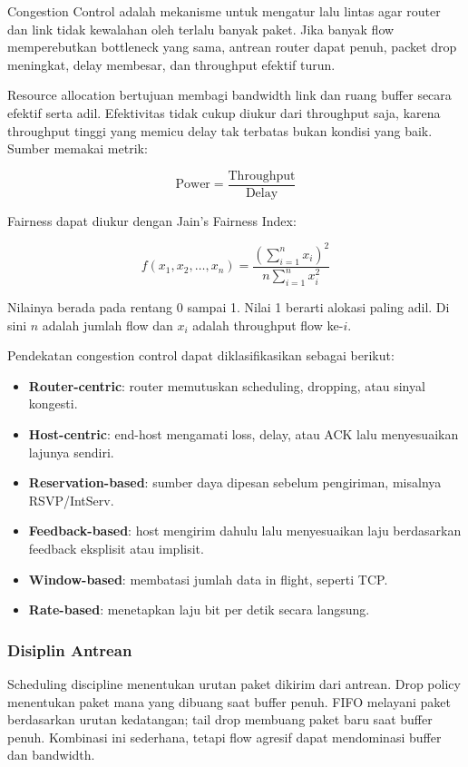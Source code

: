 \begin{jawab}
Congestion Control adalah mekanisme untuk mengatur lalu lintas agar router dan link tidak kewalahan oleh terlalu banyak paket. Jika banyak flow memperebutkan bottleneck yang sama, antrean router dapat penuh, packet drop meningkat, delay membesar, dan throughput efektif turun.
\end{jawab}

Resource allocation bertujuan membagi bandwidth link dan ruang buffer secara efektif serta adil. Efektivitas tidak cukup diukur dari throughput saja, karena throughput tinggi yang memicu delay tak terbatas bukan kondisi yang baik. Sumber memakai metrik:

\[
\text{Power} = \frac{\text{Throughput}}{\text{Delay}}
\]

Fairness dapat diukur dengan Jain's Fairness Index:

\[
f(x_1,x_2,\ldots,x_n)=\frac{\left(\sum_{i=1}^{n}x_i\right)^2}{n\sum_{i=1}^{n}x_i^2}
\]

Nilainya berada pada rentang 0 sampai 1. Nilai 1 berarti alokasi paling adil. Di sini $n$ adalah jumlah flow dan $x_i$ adalah throughput flow ke-$i$.

Pendekatan congestion control dapat diklasifikasikan sebagai berikut:

\begin{itemize}
    \item \textbf{Router-centric}: router memutuskan scheduling, dropping, atau sinyal kongesti.
    \item \textbf{Host-centric}: end-host mengamati loss, delay, atau ACK lalu menyesuaikan lajunya sendiri.
    \item \textbf{Reservation-based}: sumber daya dipesan sebelum pengiriman, misalnya RSVP/IntServ.
    \item \textbf{Feedback-based}: host mengirim dahulu lalu menyesuaikan laju berdasarkan feedback eksplisit atau implisit.
    \item \textbf{Window-based}: membatasi jumlah data in flight, seperti TCP.
    \item \textbf{Rate-based}: menetapkan laju bit per detik secara langsung.
\end{itemize}

\subsubsection*{Disiplin Antrean}

Scheduling discipline menentukan urutan paket dikirim dari antrean. Drop policy menentukan paket mana yang dibuang saat buffer penuh. FIFO melayani paket berdasarkan urutan kedatangan; tail drop membuang paket baru saat buffer penuh. Kombinasi ini sederhana, tetapi flow agresif dapat mendominasi buffer dan bandwidth.

